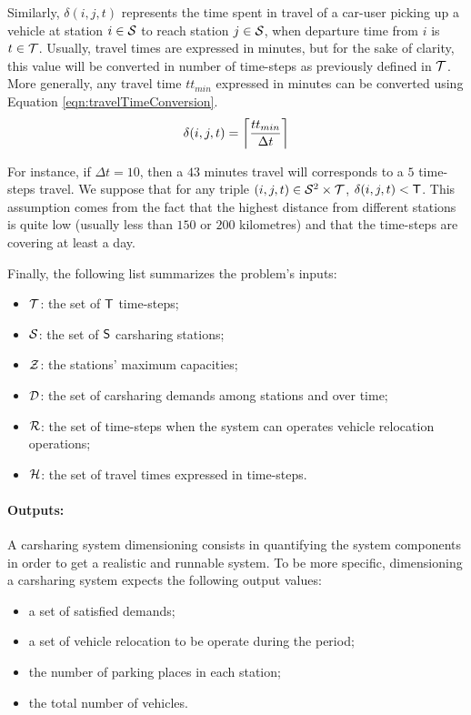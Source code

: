 Similarly, $\delta(i,j,t)$ represents the time spent in travel of a car-user picking up a vehicle at station $i \in \stationSet$ to reach station $j \in \stationSet$, when departure time from $i$ is $t \in \timeStepSet$.
Usually, travel times are expressed in minutes, but for the sake of clarity, this value will be converted in number of time-steps as previously defined in $\timeStepSet$.
More generally, any travel time $tt_{min}$ expressed in minutes can be converted using Equation \ref{eqn:travelTimeConversion}.
\begin{equation}\label{eqn:travelTimeConversion}
\delta(i,j,t) = \ceil*{\frac{tt_{min}}{\Delta t}}
\end{equation}

For instance, if $\Delta t = 10$, then a $43$ minutes travel will corresponds to a $5$ time-steps travel.
We suppose that for any triple $(i,j,t) \in \stationSet^2 \times \timeStepSet$, $\delta(i,j,t) < \nbTimeSteps$.
This assumption comes from the fact that the highest distance from different stations is quite low (usually less than $150$ or $200$ kilometres) and that the time-steps are covering at least a day.
\medskip

Finally, the following list summarizes the problem's inputs:
\begin{itemize}
\item $\timeStepSet$: the set of $\nbTimeSteps$ time-steps;
\item $\stationSet$: the set of $\nbStations$ carsharing stations;
\item $\sCapaSet$: the stations' maximum capacities;
\item $\demandSet$: the set of carsharing demands among stations and over time;
\item $\relocTimeStepSet$: the set of time-steps when the system can operates vehicle relocation operations;
\item $\travelTimeSet$: the set of travel times expressed in time-steps.
\end{itemize}

\paragraph{Outputs:}
A carsharing system dimensioning consists in quantifying the system components in order to get a realistic and runnable system.
To be more specific, dimensioning a carsharing system expects the following output values:
\begin{itemize}
\item a set of satisfied demands;
\item a set of vehicle relocation to be operate during the period;
\item the number of parking places in each station;
\item the total number of vehicles.
\end{itemize}

